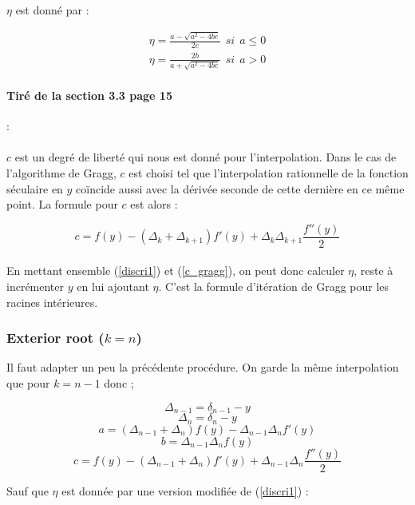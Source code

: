\documentclass[10pt,a4paper]{article}
\begin{document}
$\eta$ est donné par : 

\begin{eqnarray}\label{discri1}
\eta = \frac{a - \sqrt{a^2 - 4bc}}{2c}~~ si~~ a \leq 0 \\
\eta = \frac{2b}{a + \sqrt{a^2 - 4bc}}~~ si~~ a > 0
\end{eqnarray}

\paragraph{Tiré de la section 3.3 page 15}:

\paragraph{}
$c$ est un degré de liberté qui nous est donné pour l'interpolation. Dans le cas de l'algorithme de Gragg, $c$ est choisi tel que l'interpolation rationnelle de la fonction séculaire en $y$ coïncide aussi avec la dérivée seconde de cette dernière en ce même point. La formule pour $c$ est alors : 

\begin{equation}\label{c_gragg}
c = f(y) - (\Delta_k + \Delta_{k+1}) f'(y) + \Delta_k \Delta_{k+1} \frac{f''(y)}{2}
\end{equation}

\paragraph{}
En mettant ensemble (\ref{discri1}) et (\ref{c_gragg}), on peut donc calculer $\eta$, reste à incrémenter $y$ en lui ajoutant $\eta$. C'est la formule d'itération de Gragg pour les racines intérieures.


\subsubsection{Exterior root ($k=n$)}

Il faut adapter un peu la précédente procédure. On garde la même interpolation que pour $k=n-1$ donc ;

$$ \Delta_{n-1} = \delta_{n-1} - y$$ 
$$ \Delta_n = \delta_n - y$$ 
$$ a = (\Delta_{n-1} + \Delta_n) f(y) - \Delta_{n-1} \Delta_nf'(y)$$
$$ b = \Delta_{n-1} \Delta_n f(y)$$
$$c = f(y) - (\Delta_{n-1} + \Delta_n) f'(y) + \Delta_{n-1} \Delta_n \frac{f''(y)}{2}$$

Sauf que $\eta$ est donnée par une version modifiée de (\ref{discri1}) : 
\end{document}
